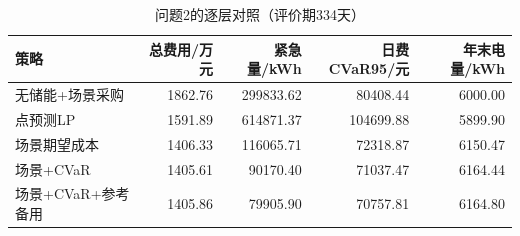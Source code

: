\begin{table}[htbp]\centering\small\caption{问题2的逐层对照（评价期334天）}
\label{tab:ablation}
\begin{tabularx}{\linewidth}{LRRRR}\toprule
策略 & 总费用/万元 & 紧急量/kWh & 日费CVaR95/元 & 年末电量/kWh\\\midrule
无储能+场景采购 & 1862.76 & 299833.62 & 80408.44 & 6000.00\\
点预测LP & 1591.89 & 614871.37 & 104699.88 & 5899.90\\
场景期望成本 & 1406.33 & 116065.71 & 72318.87 & 6150.47\\
场景+CVaR & 1405.61 & 90170.40 & 71037.47 & 6164.44\\
场景+CVaR+参考备用 & 1405.86 & 79905.90 & 70757.81 & 6164.80\\
\bottomrule\end{tabularx}\end{table}